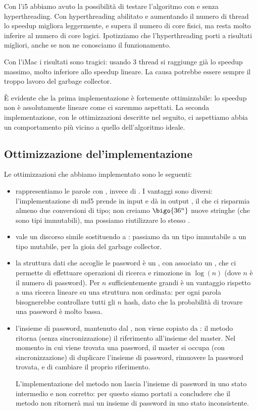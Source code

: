 \documentclass[]{myarticle}
\begin{document}
Con l'i5 abbiamo avuto la possibilit\`a di testare l'algoritmo con e senza hyperthreading.
Con hyperthreading abilitato e aumentando il numero di thread lo speedup migliora leggermente, e supera il numero di core fisici, ma resta molto inferire al numero di core logici.
Ipotizziamo che l'hyperthreading porti a risultati migliori, anche se non ne conosciamo il funzionamento.

Con l'iMac i risultati sono tragici: usando 3 thread si raggiunge gi\`a lo speedup massimo, molto inferiore allo speedup lineare.
La causa potrebbe essere sempre il troppo lavoro del garbage collector.

\`E evidente che la prima implementazione \`e fortemente ottimizzabile: lo speedup non \`e assolutamente lineare come ci saremmo aspettati.
La seconda implementazione, con le ottimizzazioni descritte nel seguito, ci aspettiamo abbia un comportamento pi\`u vicino a quello dell'algoritmo ideale.

\subsection{Ottimizzazione del'implementazione}

Le ottimizzazioni che abbiamo implementato sono le seguenti:
\begin{itemize}
	\item rappresentiamo le parole con , invece di .
	I vantaggi sono diversi: l'implementazione di md5 prende in input e d\`a in output , il che ci risparmia almeno due conversioni di tipo; non creiamo $\bigo{36^n}$ nuove stringhe (che sono tipi immutabili), ma possiamo riutilizzare lo stesso .
	\item vale un discorso simile sostituendo  a : passiamo da un tipo immutabile a un tipo mutabile, per la gioia del garbage collector.
	\item la struttura dati che accoglie le password \`e un , con associato un , che ci permette di effettuare operazioni di ricerca e rimozione in $\log(n)$ (dove $n$ \`e il numero di password).
	Per $n$ sufficientemente grandi \`e un vantaggio rispetto a una ricerca lineare su una struttura non ordinata: per ogni parola bisognerebbe controllare tutti gli $n$ hash, dato che la probabilit\`a di trovare una password \`e molto bassa.
	\item l'insieme di password, mantenuto dal , non viene copiato da : il metodo ritorna (senza sincronizzazione) il riferimento all'insieme del master.
	Nel momento in cui viene trovata una password, il master si occupa (con sincronizzazione) di duplicare l'insieme di password, rimuovere la password trovata, e di cambiare il proprio riferimento.

	L'implementazione del metodo  non lascia l'insieme di password in uno stato intermedio e non corretto: per questo siamo portati a concludere che il metodo  non ritorner\`a mai un insieme di password in uno stato inconsistente.
\end{itemize}
\end{document}
